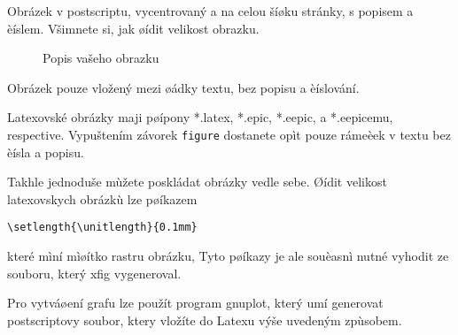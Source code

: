 \documentclass[12pt]{article}
\begin{document}
Obrázek v postscriptu, vycentrovaný a na celou šíøku stránky, s
popisem a èíslem. Všimnete si, jak øídit velikost obrazku.
\begin{figure}[ht]
\epsfysize=3cm \centerline{} \caption{Popis
vašeho obrazku} \label{labelvasehoobrazku}
\end{figure}

Obrázek pouze vložený mezi øádky textu, bez popisu a èíslování.\\
\epsfxsize=1cm
\rule{0pt}{0pt}\hfill{}\hfill\rule{0pt}{0pt}

Latexovské obrázky maji pøípony *.latex, *.epic, *.eepic, a
*.eepicemu, respective.
%
Vypuštením závorek {\tt figure} dostanete opìt pouze rámeèek v textu
bez èísla a popisu.

Takhle jednoduše mùžete poskládat obrázky vedle sebe.
Øídit velikost latexovskych obrázkù lze pøíkazem
\begin{verbatim}
\setlength{\unitlength}{0.1mm}
\end{verbatim}
které mìní mìøítko rastru obrázku, Tyto pøíkazy je ale souèasnì
nutné vyhodit ze souboru, který xfig vygeneroval.

Pro vytváøení grafu lze použít program gnuplot, který umí generovat
postscriptovy soubor, ktery vložíte do Latexu výše uvedeným
zpùsobem.
\end{document}
